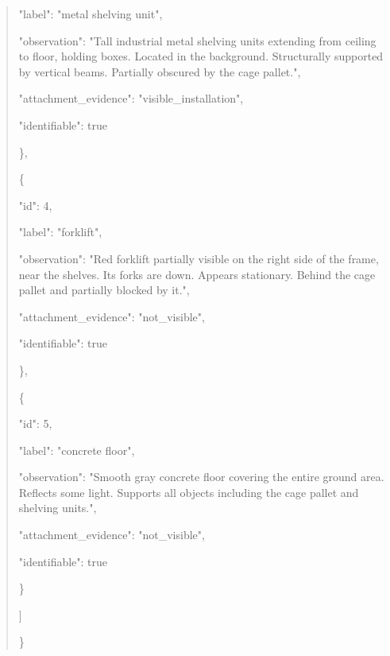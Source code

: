 \documentclass[10pt,a4paper]{article}
\begin{document}
\begin{quote}
      "label":\allowbreak{} "metal shelving unit",\allowbreak{}\par
      "observation":\allowbreak{} "Tall industrial metal shelving units extending from ceiling to floor,\allowbreak{} holding boxes. Located in the background. Structurally supported by vertical beams. Partially obscured by the cage pallet.",\allowbreak{}\par
      "attachment\_evidence":\allowbreak{} "visible\_installation",\allowbreak{}\par
      "identifiable":\allowbreak{} true\par
    \},\allowbreak{}\par
    \{\par
      "id":\allowbreak{} 4,\allowbreak{}\par
      "label":\allowbreak{} "forklift",\allowbreak{}\par
      "observation":\allowbreak{} "Red forklift partially visible on the right side of the frame,\allowbreak{} near the shelves. Its forks are down. Appears stationary. Behind the cage pallet and partially blocked by it.",\allowbreak{}\par
      "attachment\_evidence":\allowbreak{} "not\_visible",\allowbreak{}\par
      "identifiable":\allowbreak{} true\par
    \},\allowbreak{}\par
    \{\par
      "id":\allowbreak{} 5,\allowbreak{}\par
      "label":\allowbreak{} "concrete floor",\allowbreak{}\par
      "observation":\allowbreak{} "Smooth gray concrete floor covering the entire ground area. Reflects some light. Supports all objects including the cage pallet and shelving units.",\allowbreak{}\par
      "attachment\_evidence":\allowbreak{} "not\_visible",\allowbreak{}\par
      "identifiable":\allowbreak{} true\par
    \}\par
  ]\par
\}
\end{quote}
\end{document}
